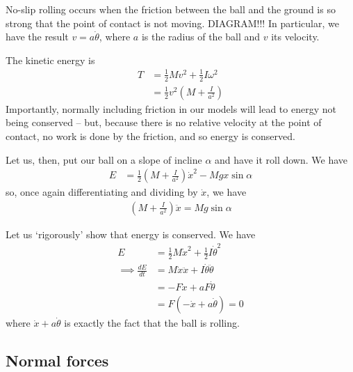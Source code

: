 \documentclass{../template/note}
\begin{document}
    \begin{example*}
        No-slip rolling occurs when the friction between the ball and the ground is so strong that the point of contact is not moving. DIAGRAM!!! In particular, we have the result \(v = a\dot \theta\), where \(a\) is the radius of the ball and \(v\) its velocity.

        The kinetic energy is
        \begin{align*}
            T &= \frac 1 2 Mv^2 + \frac 1 2 I \omega^2 \\
            &= \frac 1 2 v^2 \left(M + \frac I {a^2}\right)
        \end{align*}
        Importantly, normally including friction in our models will lead to energy not being conserved -- but, because there is no relative velocity at the point of contact, no work is done by the friction, and so energy is conserved.

        Let us, then, put our ball on a slope of incline \(\alpha\) and have it roll down. We have
        \begin{align*}
            E &= \frac 1 2 \left(M + \frac I {a^2}\right) \dot x^2 - Mgx \sin \alpha
        \end{align*}
        so, once again differentiating and dividing by \(\dot x\), we have
        \begin{align*}
            \left(M + \frac I{a^2}\right) \ddot x = Mg \sin \alpha
        \end{align*}

        Let us `rigorously' show that energy is conserved. We have
        \begin{align*}
            E &= \frac 1 2 M \dot x^2 + \frac 1 2 I \dot \theta^2 \\
            \implies \frac{dE}{dt} &= M \dot x \ddot x + I \dot \theta \ddot \theta \\
            &= -F\dot x + a F \dot \theta \\
            &= F(-\dot x + a \dot \theta) = 0
        \end{align*}
        where \(\dot x + a \dot \theta\) is exactly the fact that the ball is rolling.        
    \end{example*}

    \subsection{Normal forces}
\end{document}
